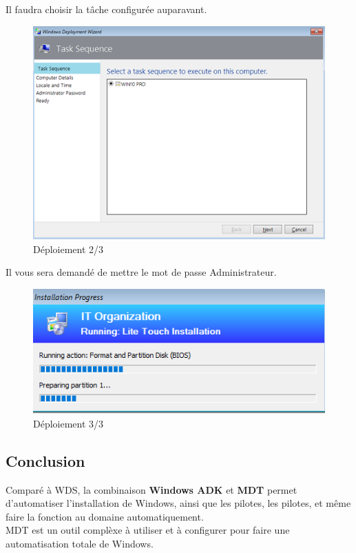 \documentclass[11pt,a4paper,oneside]{article}
\begin{document}
Il faudra choisir la tâche configurée auparavant.
\begin{figure}[hbtp]
\centering
\includegraphics[scale=0.7]{Pictures/Deploiement/DEP2.png}
\caption{\label{etiquette} Déploiement 2/3}
\end{figure}

\newpage
Il vous sera demandé de mettre le mot de passe Administrateur.
\begin{figure}[hbtp]
\centering
\includegraphics[scale=0.7]{Pictures/Deploiement/DEP3.png}
\caption{\label{etiquette} Déploiement 3/3}
\end{figure}
\subsection{Conclusion}
Comparé à WDS, la combinaison \textbf{Windows ADK} et \textbf{MDT} permet d'automatiser l'installation de Windows, ainsi que les pilotes, les pilotes, et même faire la fonction au domaine automatiquement.\\

MDT est un outil complèxe à utiliser et à configurer pour faire une automatisation totale de Windows.
\end{document}
